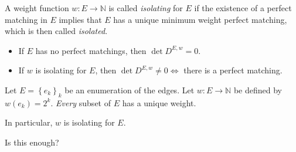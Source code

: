 \documentclass{beamer}
\theoremstyle{remark}
\newcommand{\nn}{\mathbb{N}}
\begin{document}
\begin{frame}[allowframebreaks]
  \begin{definition}
    A weight function $w : E \to \nn$ is called \emph{isolating} for
    $E$ if the existence of a perfect matching in $E$
    implies that $E$ has a unique minimum weight perfect matching,
    which is then called \emph{isolated}.
  \end{definition}

  \begin{corollary}
    \begin{itemize}
      \item If $E$ has no perfect matchings, then
            $\det D^{E,w} = 0$.
      \item If $w$ is isolating for $E$,
            then $\det D^{E,w} \ne 0 \iff $ there is a perfect matching.
    \end{itemize}
  \end{corollary}

  \begin{example}
    Let $E = \left\{e_k\right\}_k$ be an enumeration of the edges.
    Let $w : E \to \nn$ be defined by
    $w(e_k) = 2^k$. \emph{Every} subset of $E$ has a unique
    weight.

    In particular, $w$ is isolating for $E$.

    Is this enough?
  \end{example}
\end{frame}
\end{document}
